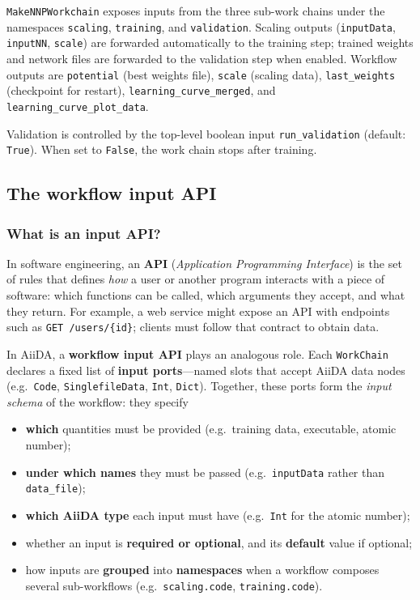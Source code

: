 \texttt{MakeNNPWorkchain} exposes inputs from the three sub-work chains under the
namespaces \texttt{scaling}, \texttt{training}, and \texttt{validation}.
Scaling outputs (\texttt{inputData}, \texttt{inputNN}, \texttt{scale}) are forwarded
automatically to the training step; trained weights and network files are forwarded to
the validation step when enabled.
Workflow outputs are \texttt{potential} (best weights file), \texttt{scale}
(scaling data), \texttt{last\_weights} (checkpoint for restart),
\texttt{learning\_curve\_merged}, and \texttt{learning\_curve\_plot\_data}.

Validation is controlled by the top-level boolean input \texttt{run\_validation}
(default: \texttt{True}).
When set to \texttt{False}, the work chain stops after training.

\subsection{The workflow input API}
\label{subsec:input-api}

\subsubsection{What is an input API?}

In software engineering, an \textbf{API} (\emph{Application Programming Interface})
is the set of rules that defines \emph{how} a user or another program interacts with
a piece of software: which functions can be called, which arguments they accept, and
what they return.
For example, a web service might expose an API with endpoints such as
\texttt{GET /users/\{id\}}; clients must follow that contract to obtain data.

In AiiDA, a \textbf{workflow input API} plays an analogous role.
Each \texttt{WorkChain} declares a fixed list of \textbf{input ports}---named slots
that accept AiiDA data nodes (e.g.\ \texttt{Code}, \texttt{SinglefileData},
\texttt{Int}, \texttt{Dict}).
Together, these ports form the \emph{input schema} of the workflow: they specify
\begin{itemize}
  \item \textbf{which} quantities must be provided (e.g.\ training data, executable,
        atomic number);
  \item \textbf{under which names} they must be passed (e.g.\ \texttt{inputData}
        rather than \texttt{data\_file});
  \item \textbf{which AiiDA type} each input must have (e.g.\ \texttt{Int} for the
        atomic number);
  \item whether an input is \textbf{required or optional}, and its \textbf{default}
        value if optional;
  \item how inputs are \textbf{grouped} into \textbf{namespaces} when a workflow
        composes several sub-workflows (e.g.\ \texttt{scaling.code},
        \texttt{training.code}).
\end{itemize}

